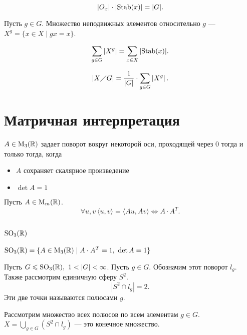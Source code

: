 \documentclass[11pt,dvipsnames]{article}
\begin{document}
\begin{thm}
    \[
	\lvert O_x \rvert  \cdot \lvert {\mathop{\text{\rm Stab}}}(x) \rvert = \lvert G \rvert 
    .\] 
\end{thm}
\begin{defn}
    Пусть $ g \in G$. {\sf Множество неподвижных элементов} относительно $ g$ --- $ X^{g} = \{x \in X \mid gx = x\}$.
\end{defn}
\begin{thm}
    \[
	\sum_{g \in G} \left| X^{g} \right|  = \sum_{x \in X}{\left|  {\mathop{\text{\rm Stab}}}(x) \right|} 
    .\] 
\end{thm}
\begin{thm}
    \[
    \left| X \diagup G \right| = \frac{1}{\left| G \right| } \cdot \sum_{g \in G}^{} \left| X^{g} \right| 
    .\] 
\end{thm}
\section{Матричная интерпретация}
\begin{thm}
    $ A \in {\mathop{\text{\rm M}}}_3(\mathbb{R})$ задает поворот вокруг некоторой оси, проходящей через 0 тогда и только тогда, когда 
    \begin{itemize}[noitemsep]
	\item $ A$ сохраняет скалярное произведение 
	     \item $ \det A = 1$
    \end{itemize}
\end{thm}
\begin{thm}
    Пусть $ A \in {\mathop{\text{\rm M}}}_m(\mathbb{R})$. 
     \[
    \forall u, v ~ \langle u, v \rangle = \langle Au, Av \rangle \Longleftrightarrow A \cdot A^{T}
    .\] 
\end{thm}
\subsection{$ {\mathop{\text{\rm SO}}}_3(\mathbb{R})$}
\begin{defn}
$ {\mathop{\text{\rm SO}}}_3(\mathbb{R}) = \{A \in {\mathop{\text{\rm M}}}_3(\mathbb{R}) \mid A\cdot A^{T }= 1 ,~  \det A = 1\}$
\end{defn}
Пусть $ G \leqslant {\mathop{\text{\rm SO}}}_3(\mathbb{R}), ~ 1 < \lvert G \rvert < \infty$.
Пусть $ g \in G$. Обозначим этот поворот $ l_g$.
Также рассмотрим единичную сферу $ S^2$.
\[
\left| S^2 \cap l_g \right|  = 2
.\] 
Эти две точки называются {\sf  полюсами} $ g$.  

Рассмотрим множество всех полюсов по всем элементам $ g \in G$. $ X = \bigcup_{g \in G} (S^2 \cap l_g) $ --- это конечное множество.
\end{document}
